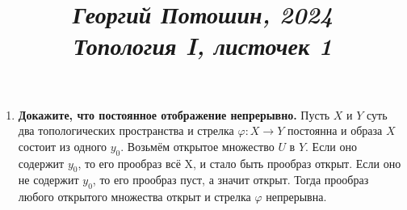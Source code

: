 \documentclass{article}
\title{
\textit{\small{Георгий Потошин, 2024}}\\
\vspace{0.3ex}
\textit{\huge{Топология I, листочек 1}}\vspace{1ex}
}
\date{\vspace{-10ex}}
\begin{document}
\maketitle

\begin{enumerate}
    \item \textbf{Докажите, что постоянное отображение непрерывно.} 
        Пусть $X$ и $Y$ суть два топологических пространства и стрелка
        $\varphi: X \longrightarrow Y$ постоянна и образа $X$ состоит из
        одного $y_0$. Возьмём открытое множество $U$ в $Y$. Если оно содержит
        $y_0$, то его прообраз всё X, и стало быть прообраз открыт. Если оно не
        содержит $y_0$, то его прообраз пуст, а значит открыт. Тогда прообраз
        любого открытого множества открыт и стрелка $\varphi$ непрерывна.


\end{enumerate}
\end{document}
